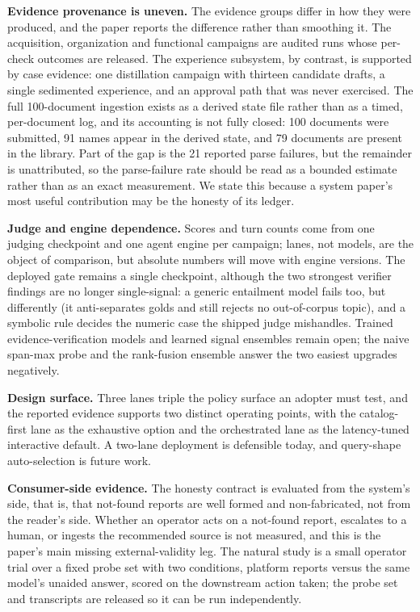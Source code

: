 \noindent\textbf{Evidence provenance is uneven.} The evidence groups differ in
how they were produced, and the paper reports the difference rather than
smoothing it. The acquisition, organization and functional campaigns are
audited runs whose per-check outcomes are released. The experience subsystem,
by contrast, is supported by case evidence: one distillation campaign with
thirteen candidate drafts, a single sedimented experience, and an approval
path that was never exercised. The full 100-document ingestion exists as a
derived state file rather than as a timed, per-document log, and its
accounting is not fully closed: 100 documents were submitted, 91 names appear
in the derived state, and 79 documents are present in the library. Part of the
gap is the 21 reported parse failures, but the remainder is unattributed, so
the parse-failure rate should be read as a bounded estimate rather than as an
exact measurement. We state this because a system paper's most useful
contribution may be the honesty of its ledger.

\noindent\textbf{Judge and engine dependence.} Scores and turn counts come
from one judging checkpoint and one agent engine per campaign; lanes, not
models, are the object of comparison, but absolute numbers will move with
engine versions. The deployed gate remains a single checkpoint, although the
two strongest verifier findings are no longer single-signal: a generic
entailment model fails too, but differently (it anti-separates golds and still
rejects no out-of-corpus topic), and a symbolic rule decides the numeric case
the shipped judge mishandles. Trained evidence-verification models and learned
signal ensembles remain open; the naive span-max probe and the rank-fusion
ensemble answer the two easiest upgrades negatively.

\noindent\textbf{Design surface.} Three lanes triple the policy surface an
adopter must test, and the reported evidence supports two distinct operating
points, with the catalog-first lane as the exhaustive option and the
orchestrated lane as the latency-tuned interactive default. A two-lane
deployment is defensible today, and query-shape auto-selection is future work.

\noindent\textbf{Consumer-side evidence.} The honesty contract is evaluated
from the system's side, that is, that not-found reports are well formed and
non-fabricated, not from the reader's side. Whether an operator acts on a
not-found report, escalates to a human, or ingests the recommended source is
not measured, and this is the paper's main missing external-validity leg. The
natural study is a small operator trial over a fixed probe set with two
conditions, platform reports versus the same model's unaided answer, scored on
the downstream action taken; the probe set and transcripts are released so it
can be run independently.

